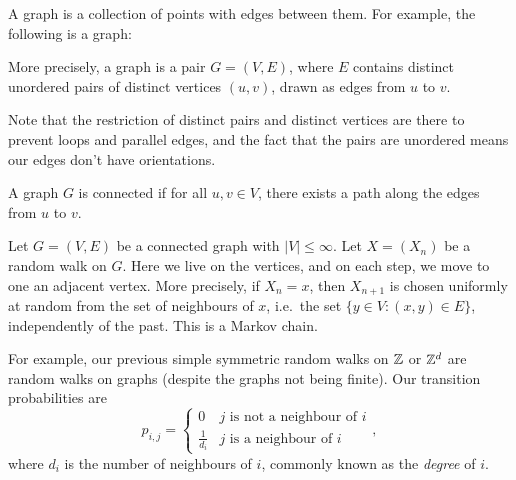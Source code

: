\documentclass[a4paper]{article}
\begin{document}
\begin{eg}
  A graph is a collection of points with edges between them. For example, the following is a graph:
  \begin{center}
  \end{center}
  More precisely, a graph is a pair $G = (V, E)$, where $E$ contains distinct unordered pairs of distinct vertices $(u, v)$, drawn as edges from $u$ to $v$.

  Note that the restriction of distinct pairs and distinct vertices are there to prevent loops and parallel edges, and the fact that the pairs are unordered means our edges don't have orientations.

  A graph $G$ is connected if for all $u, v \in V$, there exists a path along the edges from $u$ to $v$.

  Let $G = (V, E)$ be a connected graph with $|V| \leq \infty$. Let $X = (X_n)$ be a random walk on $G$. Here we live on the vertices, and on each step, we move to one an adjacent vertex. More precisely, if $X_n = x$, then $X_{n + 1}$ is chosen uniformly at random from the set of neighbours of $x$, i.e.\ the set $\{y \in V: (x, y) \in E\}$, independently of the past. This is a Markov chain.

  For example, our previous simple symmetric random walks on $\mathbb{Z}$ or $\mathbb{Z}^d$ are random walks on graphs (despite the graphs not being finite). Our transition probabilities are
  \[
    p_{i, j} =
    \begin{cases}
      0 & j\text{ is not a neighbour of }i\\
      \frac{1}{d_i} & j\text{ is a neighbour of }i
    \end{cases},
  \]
  where $d_i$ is the number of neighbours of $i$, commonly known as the \emph{degree} of $i$.


\end{eg}
\end{document}
